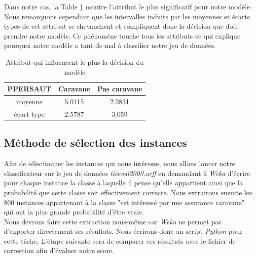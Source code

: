 \documentclass[10pt,a4paper]{article}
\begin{document}
				Dans notre cas, la Table \ref{tab:cap_desc} montre l'attribut le plus significatif pour notre modèle.	Nous remarquons cependant que les intervalles induits par les moyennes et écarts types de cet attribut se chevauchent et compliquent donc la décision que doit prendre notre modèle. Ce phénomène touche tous les attributs ce qui explique pourquoi notre modèle a tant de mal à classifier notre jeu de données. 

								
				\begin{table}[h]
					\centering
					\caption{Attribut qui influencent le plus la décision du modèle}
					\label{tab:cap_desc}
					\begin{tabular}{c|c c}
						PPERSAUT & Caravane & Pas caravane \\
						\hline
						moyenne & 5.0115 & 2.9831 \\
						écart type & 2.5787 & 3.059\\
					\end{tabular}
				\end{table}
				
			\subsection{Méthode de sélection des instances}
			
				Afin de sélectionner les instances qui nous intéresse, nous allons lancer notre classificateur sur le jeu de données \textit{ticeval2000.arff} en demandant à \textit{Weka} d'écrire pour chaque instance la classe à laquelle il pense qu'elle appartient ainsi que la probabilité que cette classe soit effectivement correcte. Nous extrairons ensuite les 800 instances appartenant à la classe "est intéressé par une assurance caravane" qui ont la plus grande probabilité d'être vraie.\\
				
				Nous devrons faire cette extraction nous-même car \textit{Weka} ne permet pas d'exporter directement ses résultats. Nous écrirons donc un script \textit{Python} pour cette tâche. L'étape suivante sera de comparer ces résultats avec le fichier de correction afin d'évaluer notre score.
          	
\end{document}
